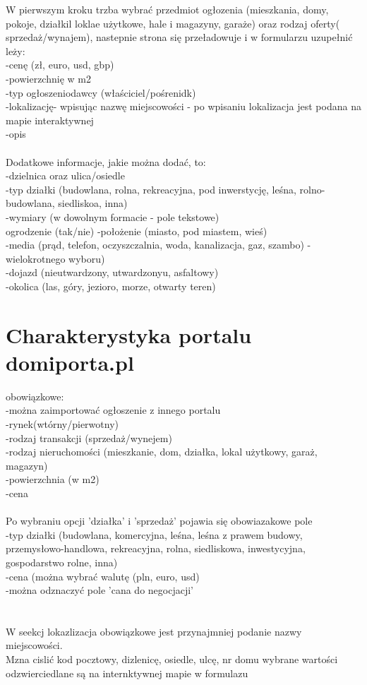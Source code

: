 \documentclass[a4paper,12pt,twoside,openany]{report}
\begin{document}
W pierwszym kroku trzba wybrać przedmiot ogłozenia (mieszkania, domy, pokoje, działkil loklae użytkowe, hale i magazyny, garaże) oraz rodzaj oferty( sprzedaż/wynajem), nastepnie strona się przeładowuje i w formularzu uzupełnić leży:\\
-cenę (zł, euro, usd, gbp)\\
-powierzchnię w m2\\
-typ ogłoszeniodawcy (właściciel/pośrenidk)\\
-lokalizację- wpisując nazwę miejscowości - po wpisaniu lokalizacja jest podana na mapie interaktywnej\\
-opis\\
\\
Dodatkowe informacje, jakie można dodać, to:\\
-dzielnica oraz ulica/osiedle\\
-typ działki (budowlana, rolna, rekreacyjna, pod inwerstycję, leśna, rolno-budowlana, siedliskoa, inna)\\
-wymiary (w dowolnym formacie - pole tekstowe)\\
ogrodzenie (tak/nie)
-położenie (miasto, pod miastem, wieś)\\
-media (prąd, telefon, oczyszczalnia, woda, kanalizacja, gaz, szambo) - wielokrotnego wyboru)\\
-dojazd (nieutwardzony, utwardzonyu, asfaltowy)\\
-okolica (las, góry, jezioro, morze, otwarty teren)\\

\section{Charakterystyka portalu domiporta.pl}
obowiązkowe:\\
-można zaimportować ogłoszenie z innego portalu\\
-rynek(wtórny/pierwotny)\\
-rodzaj transakcji (sprzedaż/wynejem)\\
-rodzaj nieruchomości (mieszkanie, dom, działka, lokal użytkowy, garaż, magazyn)\\
-powierzchnia (w m2)\\
-cena\\
\\
Po wybraniu opcji 'działka' i 'sprzedaż' pojawia się obowiazakowe pole \\
-typ działki (budowlana, komercyjna, leśna, leśna z prawem budowy, przemysłowo-handlowa, rekreacyjna, rolna, siedliskowa, inwestycyjna, gospodarstwo rolne, inna)\\
-cena (można wybrać walutę (pln, euro, usd)\\
-można odznaczyć pole 'cana do negocjacji'\\
\\\\
W seekcj lokazlizacja obowiązkowe jest przynajmniej podanie nazwy miejscowości.\\
Mzna cislić kod pocztowy, dizlenicę, osiedle, ulcę, nr domu
wybrane wartości odzwierciedlane są na internktywnej mapie w formulazu
\end{document}
